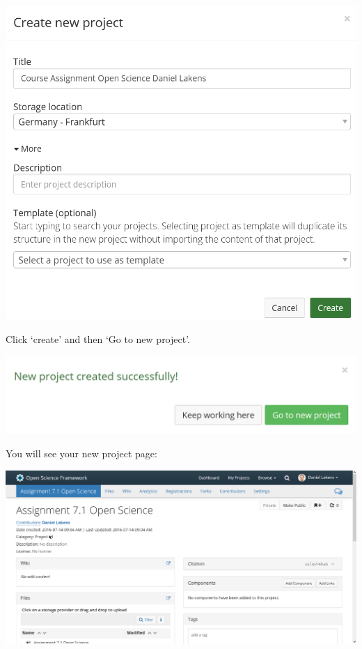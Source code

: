 \documentclass[
  oneside]{book}
\begin{document}
\begin{center}\includegraphics[width=1\linewidth]{images/newosfproject} \end{center}

Click `create' and then `Go to new project'.

\begin{center}\includegraphics[width=1\linewidth]{images/34c3f0068911af6749513b1584c4cac7} \end{center}

You will see your new project page:

\begin{center}\includegraphics[width=1\linewidth]{images/661cad8c112cd6c52562bed3cf6a5cd5} \end{center}
\end{document}
